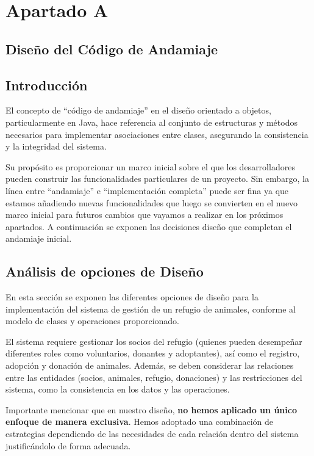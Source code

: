 \section{Apartado A}
\subsection{Diseño del Código de Andamiaje}
\subsection*{Introducción}
El concepto de \enquote{código de andamiaje} en el diseño orientado a objetos, 
particularmente en Java, hace referencia al conjunto de estructuras y métodos 
necesarios para implementar asociaciones entre clases, asegurando la 
consistencia y la integridad del sistema.\par
\vspace{0.15cm}
Su propósito es proporcionar un marco inicial sobre el que los desarrolladores pueden 
construir las funcionalidades particulares de un proyecto. Sin embargo, la línea entre
\enquote{andamiaje} e \enquote{implementación completa} puede ser fina ya que estamos 
añadiendo nuevas funcionalidades que luego se convierten en el nuevo marco inicial para 
futuros cambios que vayamos a realizar en los próximos apartados. A continuación se 
exponen las decisiones diseño que completan el andamiaje inicial.

\subsection{Análisis de opciones de Diseño}
En esta sección se exponen las diferentes opciones de diseño para la implementación 
del sistema de gestión de un refugio de animales, conforme al modelo de clases y 
operaciones proporcionado.\par
\vspace{0.15cm}
El sistema requiere gestionar los socios del refugio (quienes pueden desempeñar 
diferentes roles como voluntarios, donantes y adoptantes), así como el registro, 
adopción y donación de animales. Además, se deben considerar las relaciones entre 
las entidades (socios, animales, refugio, donaciones) y las restricciones del sistema, 
como la consistencia en los datos y las operaciones.\par
\vspace{0.15cm}
Importante mencionar que en nuestro diseño, \textbf{no hemos aplicado un único enfoque de manera 
exclusiva}. Hemos adoptado una combinación de estrategias dependiendo de las necesidades de 
cada relación dentro del sistema justificándolo de forma adecuada.

